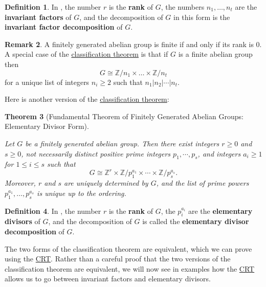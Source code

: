 \documentclass[12pt]{report}
\newtheorem{theorem}{Theorem}[chapter]
\numberwithin{equation}{section}
\numberwithin{theorem}{chapter}
\theoremstyle{definition}
\newtheorem{definition}[theorem]{Definition}
\newtheorem*{basic properties}{Basic Properties}
\newtheorem*{Important Remark}{Important Remark}
\newtheorem{remark}[theorem]{Remark}
\begin{document}
\begin{definition}
In , the number $r$ is the {\bf rank} of $G$, the numbers $n_1,\ldots,n_t$ are the {\bf invariant factors} of $G$, and the decomposition of $G$ in this form is the {\bf invariant factor decomposition} of $G$.
\end{definition}


\begin{remark} 
A finitely generated abelian group is finite if and only if its rank is $0$. A special case of the \hyperref[finitely generated abelian groups invariant factors]{classification theorem} is that if $G$ is a finite abelian group then
$$G \cong \mathbb{Z}/n_1 \times \dots \times \mathbb{Z}/n_t$$
for a unique list of integers $n_i \geqslant 2$ such that $n_1 | n_2 | \cdots | n_t$.
\end{remark}



Here is another version of the \hyperref[finitely generated abelian groups invariant factors]{classification theorem}:


\begin{theorem}[Fundamental Theorem of Finitely Generated Abelian Groups: Elementary Divisor Form]\label{finitely generated groups elementary divisors}

Let $G$ be a finitely generated abelian group. Then there exist integers $r \geqslant 0$ and $s \geqslant 0$, not necessarily distinct positive prime integers $p_1, \cdots, p_s$, and integers $a_i \geqslant 1$ for $1 \leqslant i \leqslant s$ such that
$$G \cong \mathbb{Z}^r\times \mathbb{Z}/p_1^{a_1} \times \cdots \times \mathbb{Z}/p_s^{a_s}.$$
Moreover, $r$ and $s$ are uniquely determined by $G$, and the list of prime powers $p_1^{a_1}, \dots, p_s^{a_s}$ is unique up to the ordering. 
\end{theorem}


\begin{definition}
In , the number $r$ is the {\bf rank} of $G$, the $p_i^{a_i}$ are the {\bf elementary divisors} of $G$, and the decomposition of $G$ is called the {\bf elementary divisor decomposition} of $G$.
\end{definition}


The two forms of the classification theorem are equivalent, which we can prove using the \hyperref[CRT]{CRT}. Rather than a careful proof that the two versions of the classification theorem are equivalent, we will now see in examples how the \hyperref[CRT]{CRT} allows us to go between invariant factors and elementary divisors.
\end{document}
